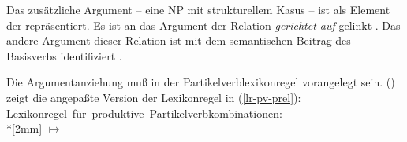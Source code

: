 \noindent
Das zusätzliche Argument -- eine NP mit strukturellem Kasus -- ist als Element der \subjl repräsentiert.
Es ist an das Argument der Relation {\em gerichtet-auf\/} gelinkt . Das andere Argument dieser
Relation ist mit dem semantischen Beitrag des Basisverbs identifiziert .

Die Argumentanziehung muß in der Partikelverblexikonregel vorangelegt sein.
() zeigt die angepaßte Version der Lexikonregel in (\ref{lr-pv-prel}):
\eas
\label{lr-pv}%
\mbox{Lexikonregel für produktive Partikelverbkombinationen:}\\*[2mm]
\onems[stem]{
           synsem \ibox{1} \onems{ loc$|$cat \ms{ head & \textit{verb\/} \\ 
                                                  subcat & \ibox{2}\\
}
                                 } \\
         }  $\mapsto$ \\
%
%
\zs
{} 

